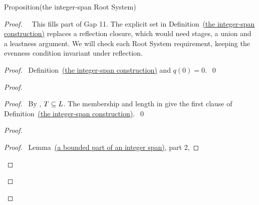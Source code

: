 \begin{mergedproofsection}
\begin{namedresult}{Proposition}{(the integer-span Root System)}\label{prop:312-rootset}
\end{namedresult}
\begin{proof}
\pfsketch\ \repair\ This fills part of Gap 11. The explicit set in
Definition~\hyperref[def:312-integral-roots]{(the integer-span construction)} replaces a reflection closure,
which would need stages, a union and a leastness argument.
We will check each Root System
requirement, keeping the evenness condition invariant under reflection.
\begin{proof}\pf\ Definition~\hyperref[def:312-integral-roots]{(the integer-span construction)} and $q(0)=0$.~\qed\end{proof}
\begin{proof}
 \begin{proof}\pf\ By , $T\subseteq L$.
 The membership and length in  give the first clause of
 Definition~\hyperref[def:312-integral-roots]{(the integer-span construction)}.~\qed\end{proof}
 \begin{proof}
  \begin{proof}\pf\ Lemma~\hyperref[lem:312-integer-span]{(a bounded part of an integer span)}, part 2,

\end{proof}
\end{proof}
\end{proof}
\end{proof}
\end{mergedproofsection}
